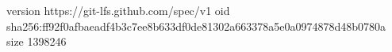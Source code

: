 version https://git-lfs.github.com/spec/v1
oid sha256:ff92f0afbaeadf4b3c7ee8b633df0de81302a663378a5e0a0974878d48b0780a
size 1398246

